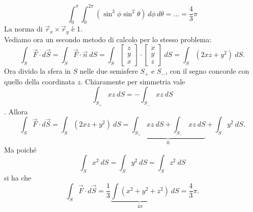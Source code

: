 \documentclass[10pt]{article}
\theoremstyle{plain}
\theoremstyle{definition}
\begin{document}
$$\int_0^{\pi} \int_0^{2\pi}(\sin^3\phi \sin^2\theta)\,d\phi \,d\theta = \dots = \frac{4}{3}\pi$$
La norma di $\vec{r}_x \times \vec{r}_y$ è 1.
\\ Vediamo ora un secondo metodo di calcolo per lo stesso problema:
$$\int_S\vec{F}\cdot d\vec{S}=\int_S \vec{F} \cdot \vec{n}\ dS= \int_S \begin{bmatrix}
z\\ y \\ x
\end{bmatrix}
\cdot
\begin{bmatrix}
x\\ y \\ z
\end{bmatrix}
\ dS
=\int_S(2xz+y^2)\ dS.
$$
Ora divido la sfera in $S$ nelle due semisfere $S_+$ e $S_-$, con il segno concorde con quello della coordinata $z$. Chiaramente per simmetria vale
$$\int_{S_+}xz\ dS = -\int_{S_-}xz\ dS $$.
Allora 
$$\int_S\vec{F}\cdot d\vec{S}=\int_S(2xz+y^2)\ dS=\underbrace{\int_{S_+}xz\ dS + \int_{S_-}xz\ dS}_0+ \int_{S}y^2\ dS.
$$
Ma poiché
$$\int_{S}x^2\ dS = \int_{S}y^2\ dS = \int_{S}z^2\ dS
$$
si ha che
$$\int_S\vec{F}\cdot d\vec{S}= \frac{1}{3}\underbrace{ \int(x^2+y^2+z^2)}_{4\pi}\ dS = \frac{4}{3}\pi.
$$
\end{document}
